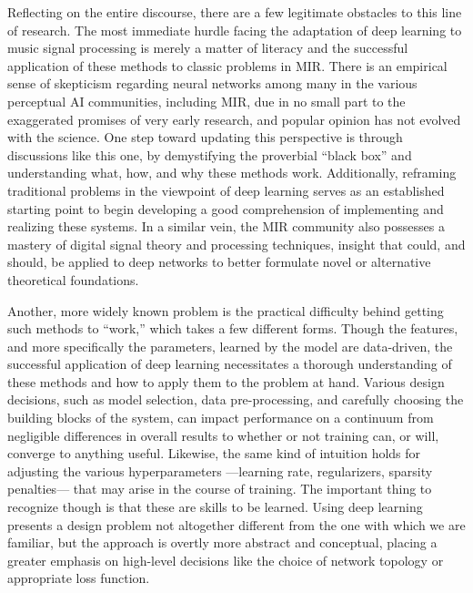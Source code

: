 Reflecting on the entire discourse, there are a few legitimate obstacles to this line of research.
The most immediate hurdle facing the adaptation of deep learning to music signal processing is merely a matter of literacy and the successful application of these methods to classic problems in MIR.
There is an empirical sense of skepticism regarding neural networks among many in the various perceptual AI communities, including MIR, due in no small part to the exaggerated promises of very early research, and popular opinion has not evolved with the science.
One step toward updating this perspective is through discussions like this one, by demystifying the proverbial ``black box'' and understanding what, how, and why these methods work.
Additionally, reframing traditional problems in the viewpoint of deep learning serves as an established starting point to begin developing a good comprehension of implementing and realizing these systems.
In a similar vein, the MIR community also possesses a mastery of digital signal theory and processing techniques, insight that could, and should, be applied to deep networks to better formulate novel or alternative theoretical foundations.

Another, more widely known problem is the practical difficulty behind getting such methods to ``work,'' which takes a few different forms.
Though the features, and more specifically the parameters, learned by the model are data-driven, the successful application of deep learning necessitates a thorough understanding of these methods and how to apply them to the problem at hand.
Various design decisions, such as model selection, data pre-processing, and carefully choosing the building blocks of the system, can impact performance on a continuum from negligible differences in overall results to whether or not training can, or will, converge to anything useful.
Likewise, the same kind of intuition holds for adjusting the various hyperparameters ---learning rate, regularizers, sparsity penalties--- that may arise in the course of training.
The important thing to recognize though is that these are skills to be learned.
Using deep learning presents a design problem not altogether different from the one with which we are familiar, but the approach is overtly more abstract and conceptual, placing a greater emphasis on high-level decisions like the choice of network topology or appropriate loss function.

